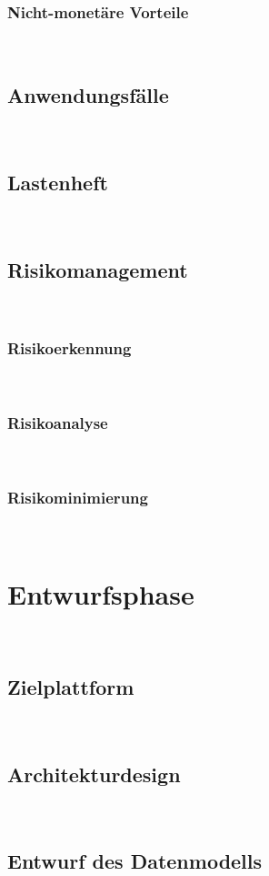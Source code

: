 \documentclass[11pt,toc=sectionentrywithoutdots, 
headheight=44pt, headings=optiontoheadandtoc, hyperfootnotes=false, hypertexnames=false]{scrartcl}
\begin{document}
\subsubsection{Nicht-monetäre Vorteile}
\blindtext\

\subsection{Anwendungsfälle}
\blindtext\

\subsection{Lastenheft}
\blindtext\

\subsection{Risikomanagement}
\blindtext\

\subsubsection{Risikoerkennung}
\blindtext\

\subsubsection{Risikoanalyse}
\blindtext\

\subsubsection{Risikominimierung}
\blindtext\

\section{Entwurfsphase}
\blindtext\

\subsection{Zielplattform}
\blindtext\

\subsection{Architekturdesign}
\blindtext\

\subsection{Entwurf des Datenmodells}
\blindtext\
\end{document}
